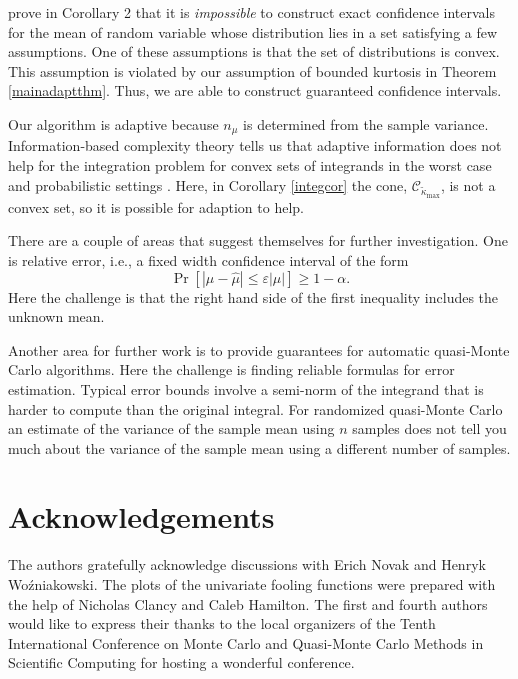 \documentclass[graybox]{svmult}
\newcommand{\abs}[1]{\left|#1\right|}
\newcommand{\hmu}{\hat{\mu}}
\newcommand{\tkappa}{\tilde{\kappa}}
\newcommand{\cc}{\mathcal{C}}
\def\abs#1{\ensuremath{\left \lvert #1 \right \rvert}}
\begin{document}
\cite{BahSav56} prove in Corollary 2 that it is \emph{impossible} to construct exact confidence intervals for the mean of random variable whose distribution lies in a set satisfying a few assumptions. One of these assumptions is that the set of distributions is convex.  This assumption is violated by our assumption of bounded kurtosis in Theorem \ref{mainadaptthm}. Thus, we are able to construct guaranteed confidence intervals.

Our algorithm is adaptive because $n_\mu$ is determined from the sample variance.  Information-based complexity theory tells us that adaptive information does not help for the integration problem for convex sets of integrands in the worst case and probabilistic settings \citep[Chapter 4, Theorem 5.2.1; Chapter 8, Corollary 5.3.1]{TraWasWoz88}.  Here, in Corollary \ref{integcor} the cone, $\cc_{\tkappa_{\max}}$, is not a convex set, so it is possible for adaption to help.

There are a couple of areas that suggest themselves for further investigation.  One is relative error, i.e., a fixed width confidence interval of the form 
\[
\Pr[\abs{\mu-\hmu} \le \varepsilon \abs{\mu}] \ge 1-\alpha.
\]
Here the challenge is that the right hand side of the first inequality includes the unknown mean.

Another area for further work is to provide guarantees for automatic quasi-Monte Carlo algorithms. Here the challenge is finding reliable formulas for error estimation.  Typical error bounds involve a semi-norm of the integrand that is harder to compute than the original integral.  For randomized quasi-Monte Carlo an estimate of the variance of the sample mean using $n$ samples does not tell you much about the variance of the sample mean using a different number of samples.


\section*{Acknowledgements} The authors gratefully acknowledge discussions with Erich Novak and Henryk Wo\'zniakowski.  The plots of the univariate fooling functions were prepared with the help of Nicholas Clancy and Caleb Hamilton.  The first and fourth authors would like to express their thanks to the local organizers of the Tenth International Conference on Monte Carlo and Quasi-Monte Carlo Methods in Scientific Computing for hosting a wonderful conference.



\end{document}
